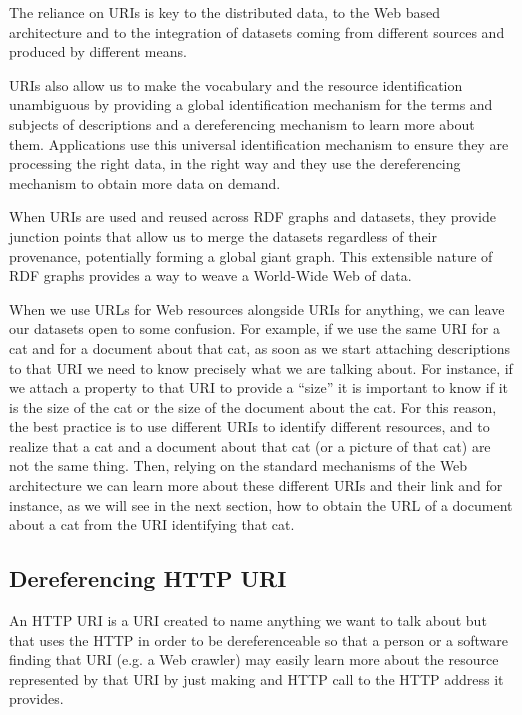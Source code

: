 The reliance on URIs is key to the distributed data, to the Web based
architecture and to the integration of datasets coming from different
sources and produced by different means.

URIs also allow us to make the vocabulary and the resource
identification unambiguous by providing a global identification
mechanism for the terms and subjects of descriptions and a dereferencing
mechanism to learn more about them. Applications use this universal
identification mechanism to ensure they are processing the right data,
in the right way and they use the dereferencing mechanism to obtain more
data on demand.

When URIs are used and reused across RDF graphs and datasets, they
provide junction points that allow us to merge the datasets regardless
of their provenance, potentially forming a global giant graph. This
extensible nature of RDF graphs provides a way to weave a World-Wide Web
of data.

When we use URLs for Web resources alongside URIs for anything, we can
leave our datasets open to some confusion. For example, if we use the
same URI for a cat and for a document about that cat, as soon as we
start attaching descriptions to that URI we need to know precisely what
we are talking about. For instance, if we attach a property to that URI
to provide a ``size'' it is important to know if it is the size of the
cat or the size of the document about the cat. For this reason, the best
practice is to use different URIs to identify different resources, and
to realize that a cat and a document about that cat (or a picture of
that cat) are not the same thing. Then, relying on the standard
mechanisms of the Web architecture we can learn more about these
different URIs and their link and for instance, as we will see in the
next section, how to obtain the URL of a document about a cat from the
URI identifying that cat.

\hypertarget{dereferencing-http-uri}{%
\subsection{Dereferencing HTTP URI }\label{dereferencing-http-uri}}

An HTTP URI is a URI created to name anything we want to talk about but
that uses the HTTP in order to be dereferenceable so that a person or a
software finding that URI (e.g. a Web crawler) may easily learn more
about the resource represented by that URI by just making and HTTP call
to the HTTP address it provides.


